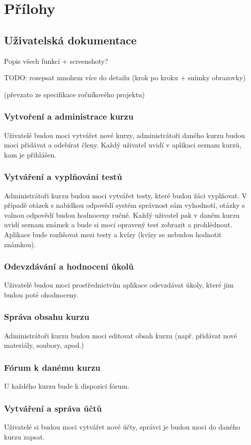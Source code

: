\documentclass[12pt,a4paper]{report}
\let\openright=\clearpage
\begin{document}
\chapter{Přílohy}

\section{Uživatelská dokumentace}
Popis všech funkcí + screenshoty?

TODO: rozepsat mnohem více do detailu (krok po kroku + snímky obrazovky)

(převzato ze specifikace ročníkového projektu)

\subsection{Vytvoření a administrace kurzu}
Uživatelé budou moci vytvářet nové kurzy, administrátoři daného kurzu budou moci přidávat a odebírat členy. Každý uživatel uvidí v aplikaci seznam kurzů, kam je přihlášen.

\subsection{Vytváření a vyplňování testů}
Administrátoři kurzu budou moci vytvářet testy, které budou žáci vyplňovat. V případě otázek s nabídkou odpovědí systém správnost sám vyhodnotí, otázky s volnou odpovědí budou hodnoceny ručně. Každý uživatel pak v daném kurzu uvidí seznam známek a bude si moci opravený test zobrazit a prohlédnout. Aplikace bude rozlišovat mezi testy a kvízy (kvízy se nebudou hodnotit známkou).

\subsection{Odevzdávání a hodnocení úkolů}
Uživatelé budou moci prostřednictvím aplikace odevzdávat úkoly, které jim budou poté ohodnoceny.

\subsection{Správa obsahu kurzu}
Administrátoři kurzu budou moci editovat obsah kurzu (např. přidávat nové materiály, soubory, apod.) 

\subsection{Fórum k danému kurzu}
U každého kurzu bude k dispozici fórum. 

\subsection{Vytváření a správa účtů}
Uživatelé si budou moci vytvářet nové účty, správci je budou moci do daného kurzu zapsat.


\openright
\end{document}
